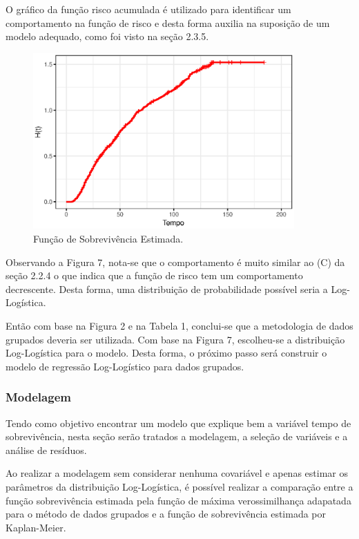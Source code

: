 \documentclass[a4paper,12pt]{article}
\begin{document}
O gráfico da função risco acumulada é utilizado para identificar um comportamento na função de risco e desta forma auxilia na suposição de um modelo adequado, como foi visto na seção 2.3.5.

\begin{figure}[H] \label{fig:surv_vit}
  \begin{center}
    \includegraphics[width=10cm]{cum_haz_vit}
    \caption{Função de Sobrevivência Estimada.}
  \end{center}
\end{figure}

Observando a Figura 7, nota-se que o comportamento é muito similar ao (C) da seção 2.2.4 o que indica que a função de risco tem um comportamento decrescente. Desta forma, uma distribuição de probabilidade possível seria a Log-Logística.

Então com base na Figura 2 e na Tabela 1, conclui-se que a metodologia de dados grupados deveria ser utilizada. Com base na Figura 7, escolheu-se a distribuição Log-Logística para o modelo. Desta forma, o próximo passo será construir o modelo de regressão Log-Logístico para dados grupados.

\subsubsection{Modelagem}

Tendo como objetivo encontrar um modelo que explique bem a variável tempo de sobrevivência, nesta seção serão tratados a modelagem, a seleção de variáveis e a análise de resíduos.

Ao realizar a modelagem sem considerar nenhuma covariável e apenas estimar os parâmetros da distribuição Log-Logística, é possível realizar a comparação entre a função sobrevivência estimada pela função de máxima verossimilhança adapatada para o método de dados grupados e a função de sobrevivência estimada por Kaplan-Meier.
\end{document}
